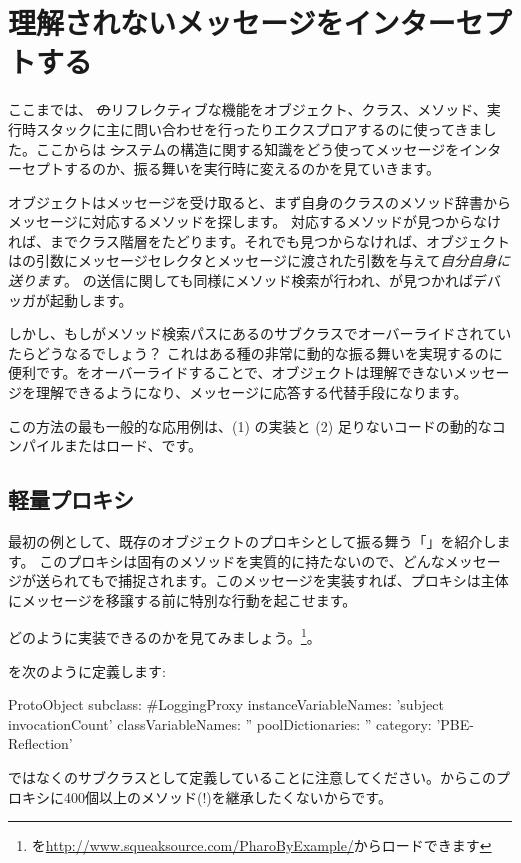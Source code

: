 \documentclass[a4paper,10pt,twoside]{book}
\begin{document}
\section{理解されないメッセージをインターセプトする}

ここまでは、 \st のリフレクティブな機能をオブジェクト、クラス、メソッド、実行時スタックに主に問い合わせを行ったりエクスプロアするのに使ってきました。ここからは \st システムの構造に関する知識をどう使ってメッセージをインターセプトするのか、振る舞いを実行時に変えるのかを見ていきます。

オブジェクトはメッセージを受け取ると、まず自身のクラスのメソッド辞書からメッセージに対応するメソッドを探します。
対応するメソッドが見つからなければ、までクラス階層をたどります。それでも見つからなければ、オブジェクトはの引数にメッセージセレクタとメッセージに渡された引数を与えて\emph{自分自身に送ります}。
の送信に関しても同様にメソッド検索が行われ、が見つかればデバッガが起動します。

しかし、もしがメソッド検索パスにあるのサブクラスでオーバーライドされていたらどうなるでしょう？
これはある種の非常に動的な振る舞いを実現するのに便利です。をオーバーライドすることで、オブジェクトは理解できないメッセージを理解できるようになり、メッセージに応答する代替手段になります。

この方法の最も一般的な応用例は、(1) の実装と (2) 足りないコードの動的なコンパイルまたはロード、です。

\subsection{軽量プロキシ}

最初の例として、既存のオブジェクトのプロキシとして振る舞う「」を紹介します。
このプロキシは固有のメソッドを実質的に持たないので、どんなメッセージが送られてもで捕捉されます。このメッセージを実装すれば、プロキシは主体にメッセージを移譲する前に特別な行動を起こせます。

どのように実装できるのかを見てみましょう。\footnote{を\url{http://www.squeaksource.com/PharoByExample/}からロードできます}。

を次のように定義します:
\begin{code}{}
ProtoObject subclass: #LoggingProxy
	instanceVariableNames: 'subject invocationCount'
	classVariableNames: ''
	poolDictionaries: ''
	category: 'PBE-Reflection'
\end{code}
ではなくのサブクラスとして定義していることに注意してください。からこのプロキシに400個以上のメソッド(!)を継承したくないからです。
\end{document}
